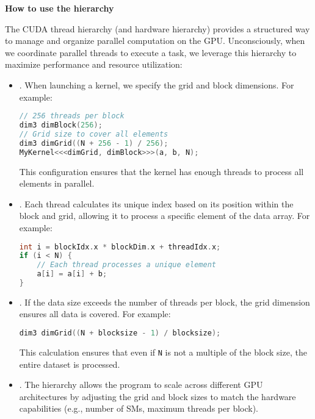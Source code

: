 \highspace
\begin{flushleft}
    \textcolor{Green3}{ \textbf{How to use the hierarchy}}
\end{flushleft}
The CUDA thread hierarchy (and hardware hierarchy) provides a structured way to manage and organize parallel computation on the GPU. Unconsciously, when we coordinate parallel threads to execute a task, we leverage this hierarchy to maximize performance and resource utilization:
\begin{itemize}
    \item {}. When launching a kernel, we specify the grid and block dimensions. For example:
    \begin{lstlisting}[language=C++]
// 256 threads per block
dim3 dimBlock(256);
// Grid size to cover all elements
dim3 dimGrid((N + 256 - 1) / 256);
MyKernel<<<dimGrid, dimBlock>>>(a, b, N);\end{lstlisting}
    This configuration ensures that the kernel has enough threads to process all elements in parallel.

    \item {}. Each thread calculates its unique index based on its position within the block and grid, allowing it to process a specific element of the data array. For example:
    \begin{lstlisting}[language=C++]
int i = blockIdx.x * blockDim.x + threadIdx.x;
if (i < N) {
	// Each thread processes a unique element
    a[i] = a[i] + b;
}\end{lstlisting}

    \item {}. If the data size exceeds the number of threads per block, the grid dimension ensures all data is covered. For example:
    \begin{lstlisting}[language=C++]
dim3 dimGrid((N + blocksize - 1) / blocksize);\end{lstlisting}
    This calculation ensures that even if \texttt{N} is not a multiple of the block size, the entire dataset is processed.

    \item {}. The hierarchy allows the program to scale across different GPU architectures by adjusting the grid and block sizes to match the hardware capabilities (e.g., number of SMs, maximum threads per block).
\end{itemize}

